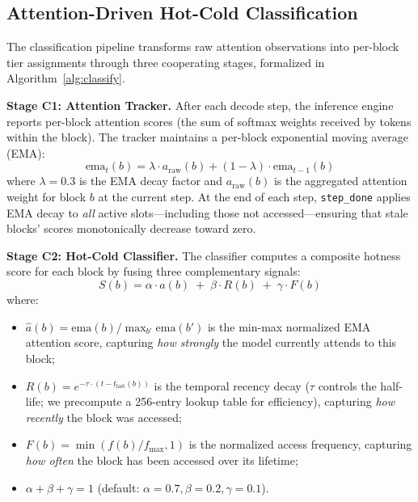 \documentclass[conference]{IEEEtran}
\begin{document}
\subsection{Attention-Driven Hot-Cold Classification}
\label{sec:classification}

The classification pipeline transforms raw attention observations into per-block tier assignments through three cooperating stages, formalized in Algorithm~\ref{alg:classify}.

\textbf{Stage C1: Attention Tracker.} After each decode step, the inference engine reports per-block attention scores (the sum of softmax weights received by tokens within the block). The tracker maintains a per-block exponential moving average (EMA):
\begin{equation}
\text{ema}_{t}(b) = \lambda \cdot a_{\text{raw}}(b) + (1 - \lambda) \cdot \text{ema}_{t-1}(b)
\end{equation}
where $\lambda = 0.3$ is the EMA decay factor and $a_{\text{raw}}(b)$ is the aggregated attention weight for block $b$ at the current step. At the end of each step, \texttt{step\_done} applies EMA decay to \emph{all} active slots---including those not accessed---ensuring that stale blocks' scores monotonically decrease toward zero.

\textbf{Stage C2: Hot-Cold Classifier.} The classifier computes a composite hotness score for each block by fusing three complementary signals:
\begin{equation}
S(b) = \alpha \cdot \hat{a}(b) \;+\; \beta \cdot R(b) \;+\; \gamma \cdot F(b)
\label{eq:hotness}
\end{equation}
where:
\begin{itemize}
\item $\hat{a}(b) = \text{ema}(b) / \max_{b'} \text{ema}(b')$ is the min-max normalized EMA attention score, capturing \emph{how strongly} the model currently attends to this block;
\item $R(b) = e^{-\tau \cdot (t - t_{\text{last}}(b))}$ is the temporal recency decay ($\tau$ controls the half-life; we precompute a 256-entry lookup table for efficiency), capturing \emph{how recently} the block was accessed;
\item $F(b) = \min(f(b) / f_{\max}, 1)$ is the normalized access frequency, capturing \emph{how often} the block has been accessed over its lifetime;
\item $\alpha + \beta + \gamma = 1$ (default: $\alpha{=}0.7, \beta{=}0.2, \gamma{=}0.1$).
\end{itemize}
\end{document}
